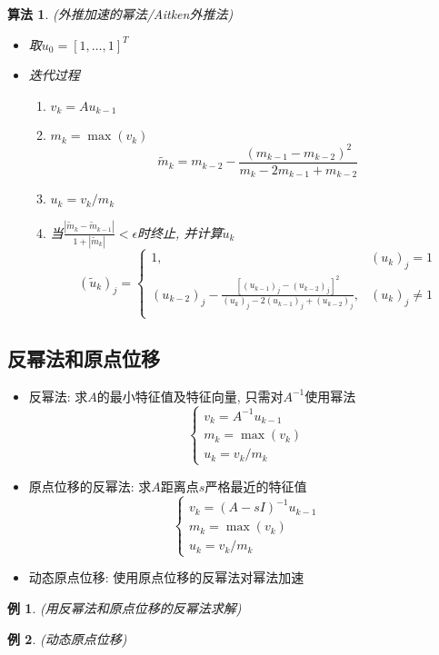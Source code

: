 \documentclass[twoside]{article}
\newtheorem{algo}{算法}[section]
\newtheorem{eg}{例}[section]
\begin{document}
\begin{algo}
  (外推加速的幂法/Aitken外推法)
  \begin{itemize}
    \item 取$u_0 = [1,\ldots,1]^T$
    \item 迭代过程
      \begin{enumerate}
        \item $v_k = A u_{k-1}$
        \item $m_k=\max{(v_k)}$
          \begin{equation}
            \tilde{m}_k=m_{k-2} - \frac{{(m_{k-1}-m_{k-2})}^2}{m_k-2m_{k-1}+m_{k-2}}
          \end{equation}
        \item $u_k=v_k/m_k$
        \item 当$\frac{|\tilde{m}_k-\tilde{m}_{k-1}|}{1+|\tilde{m}_k|}<\epsilon$时终止, 并计算$\tilde{u}_k$
          \begin{equation}
            { (\tilde{u}_k) }_j =
            \begin{cases}{}
              1, &{(u_k)}_j=1 \\
              { (u_{k-2}) }_j - \frac{{ [{ (u_{k-1}) }_j-{ (u_{k-2}) }_j] }^2}{{ (u_k) }_j-2{ (u_{k-1}) }_j+{ (u_{k-2}) }_j}, &{(u_k)}_j\ne1 \\
            \end{cases}
          \end{equation}
      \end{enumerate}
  \end{itemize}
\end{algo}
\subsection{反幂法和原点位移}
\begin{itemize}
  \item 反幂法: 求$A$的最小特征值及特征向量, 只需对$A^{-1}$使用幂法
    \begin{equation}
      \begin{cases}{}
        v_k = A^{-1}u_{k-1} \\
        m_k = \max{(v_k)} \\
        u_k = v_k / m_k
      \end{cases}
    \end{equation}
  \item 原点位移的反幂法: 求$A$距离点$s$严格最近的特征值
    \begin{equation}
      \begin{cases}{}
        v_k = {(A-sI)}^{-1}u_{k-1} \\
        m_k = \max{(v_k)} \\
        u_k = v_k / m_k
      \end{cases}
    \end{equation}
  \item 动态原点位移: 使用原点位移的反幂法对幂法加速
\end{itemize}
\begin{eg}
  (用反幂法和原点位移的反幂法求解)
\end{eg}
\begin{eg}
  (动态原点位移)
\end{eg}
\end{document}
